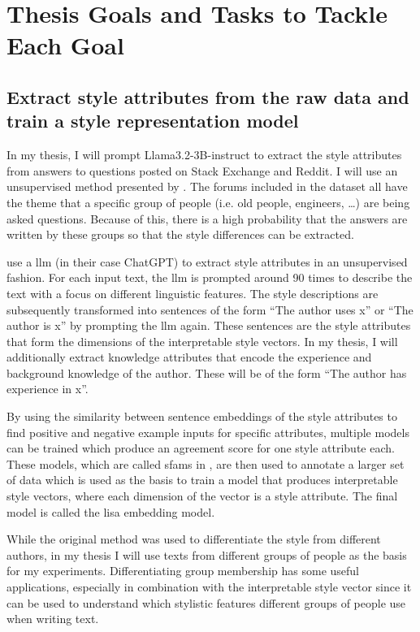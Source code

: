 
\section{Thesis Goals and Tasks to Tackle Each Goal}
\subsection{Extract style attributes from the raw data and train a style representation model}
In my thesis, I will prompt Llama3.2-3B-instruct %
to extract the style attributes from answers to questions posted on Stack Exchange and Reddit. I will use an unsupervised method presented by \citet{patelLearningInterpretableStyle2023}. The forums included in the dataset all have the theme that a specific group of people (i.e. old people, engineers, \ldots) are being asked questions. Because of this, there is a high probability that the answers are written by these groups so that the style differences can be extracted.

\citeauthor{patelLearningInterpretableStyle2023} use a \acl{llm} (in their case ChatGPT) to extract style attributes in an unsupervised fashion. For each input text, the \ac{llm} is prompted around 90 times to describe the text with a focus on different linguistic features. The style descriptions are subsequently transformed into sentences of the form \enquote{The author uses x} or \enquote{The author is x} by prompting the \ac{llm} again. These sentences are the style attributes that form the dimensions of the interpretable style vectors. In my thesis, I will additionally extract knowledge attributes that encode the experience and background knowledge of the author. These will be of the form \enquote{The author has experience in x}.

By using the similarity between sentence embeddings of the style attributes to find positive and negative example inputs for specific attributes, multiple models can be trained which produce an agreement score for one style attribute each. These models, which are called \acp{sfam} in \citet{patelLearningInterpretableStyle2023}, are then used to annotate a larger set of data which is used as the basis to train a model that produces interpretable style vectors, where each dimension of the vector is a style attribute. The final model is called the \ac{lisa} embedding model.

While the original method was used to differentiate the style from different authors, in my thesis I will use texts from different groups of people as the basis for my experiments. Differentiating group membership has some useful applications, especially in combination with the interpretable style vector since it can be used to understand which stylistic features different groups of people use when writing text. %

